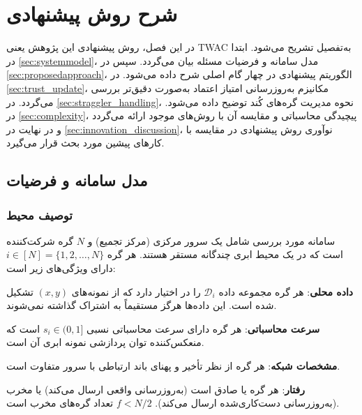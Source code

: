\chapter{شرح روش پیشنهادی}
\label{chap:approach}

در این فصل، روش پیشنهادی این پژوهش یعنی \gls{TWAC} به‌تفصیل تشریح می‌شود. ابتدا در \autoref{sec:systemmodel}، مدل سامانه و فرضیات مسئله بیان می‌گردد. سپس در \autoref{sec:proposedapproach}، الگوریتم پیشنهادی در چهار گام اصلی شرح داده می‌شود. در \autoref{sec:trust_update}، مکانیزم به‌روزرسانی امتیاز اعتماد به‌صورت دقیق‌تر بررسی می‌گردد. در \autoref{sec:straggler_handling}، نحوه مدیریت گره‌های کُند توضیح داده می‌شود. در \autoref{sec:complexity}، پیچیدگی محاسباتی و مقایسه آن با روش‌های موجود ارائه می‌گردد و در نهایت در \autoref{sec:innovation_discussion}، نوآوری روش پیشنهادی در مقایسه با کارهای پیشین مورد بحث قرار می‌گیرد.

\section{مدل سامانه و فرضیات}
\label{sec:systemmodel}

\subsection{توصیف محیط}

سامانه مورد بررسی شامل یک سرور مرکزی (مرکز تجمیع) و $N$ گره شرکت‌کننده است که در یک محیط ابری چندگانه مستقر هستند. هر گره $i \in [N] = \{1, 2, \ldots, N\}$ دارای ویژگی‌های زیر است:

\begin{itemize}
    \tick \textbf{داده محلی}: هر گره مجموعه داده $\mathcal{D}_i$ را در اختیار دارد که از نمونه‌های $(x, y)$ تشکیل شده است. این داده‌ها هرگز مستقیماً به اشتراک گذاشته نمی‌شوند.
    
    \tick \textbf{سرعت محاسباتی}: هر گره دارای سرعت محاسباتی نسبی $s_i \in (0, 1]$ است که منعکس‌کننده توان پردازشی نمونه ابری آن است.
    
    \tick \textbf{مشخصات شبکه}: هر گره از نظر تأخیر و پهنای باند ارتباطی با سرور متفاوت است.
    
    \tick \textbf{رفتار}: هر گره یا صادق است (به‌روزرسانی واقعی ارسال می‌کند) یا مخرب (به‌روزرسانی دست‌کاری‌شده ارسال می‌کند). $f < N/2$ تعداد گره‌های مخرب است.
\end{itemize}

